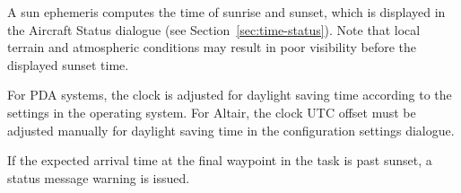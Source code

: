 A sun ephemeris computes the time of sunrise and sunset, which is displayed in the
Aircraft Status dialogue (see Section~\ref{sec:time-status}).  Note that
local terrain and atmospheric conditions may result in poor visibility
before the displayed sunset time.

For PDA systems, the clock is adjusted for daylight saving time according
to the settings in the operating system.  For Altair, the clock UTC offset
must be adjusted manually for daylight saving time in the configuration
settings dialogue.

If the expected arrival time at the final waypoint in the task is past
sunset, a status message warning is issued.
